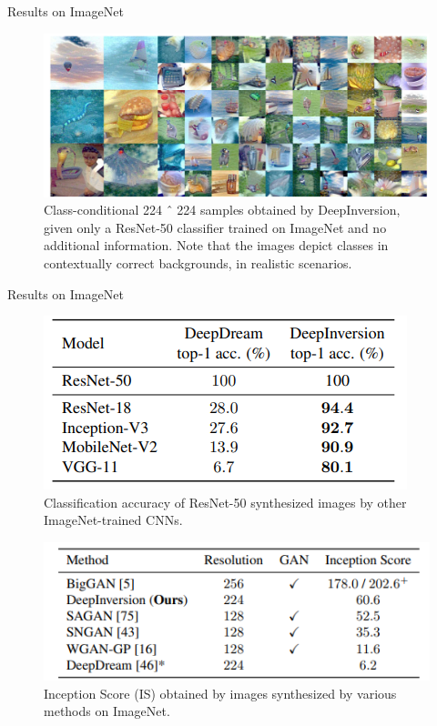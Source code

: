 \documentclass{beamer}
\begin{document}
\begin{frame}{Results on ImageNet}
    \begin{figure}
        \centering
        \includegraphics[scale=0.5]{images/distill_6.png}
        \caption{Class-conditional 224 ˆ 224 samples obtained by DeepInversion, given only a ResNet-50 classifier trained on ImageNet and no
additional information. Note that the images depict classes in contextually correct backgrounds, in realistic scenarios.}
        \label{fig:enter-label}
    \end{figure} 
\end{frame}

\begin{frame}{Results on ImageNet}
    \begin{figure}
        \centering
        \includegraphics[scale=0.65]{images/distill_7.png}
        \caption{Classification accuracy of ResNet-50 synthesized images
by other ImageNet-trained CNNs.}
        \label{fig:enter-label}
    \end{figure}
    \begin{figure}
        \centering
        \includegraphics[scale=0.65]{images/distill11.png}
        \caption{Inception Score (IS) obtained by images synthesized by
various methods on ImageNet.}
        \label{fig:enter-label}
    \end{figure}
\end{frame}
\end{document}
